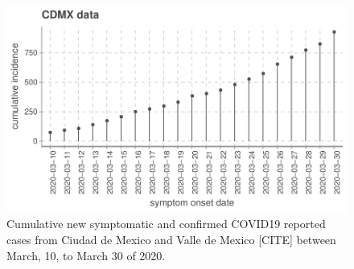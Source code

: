 \begin{figure}[htb]
    \centering
    \includegraphics[scale=0.8, keepaspectratio]{Figures/cdmx_input_data}
    \caption{%
        Cumulative new symptomatic and confirmed COVID19 reported cases from
        Ciudad de Mexico and Valle de Mexico
        [CITE] between March, 10, to March 30 of
        2020.
    }
    \label{fig:data_CDMX}
\end{figure}
%
